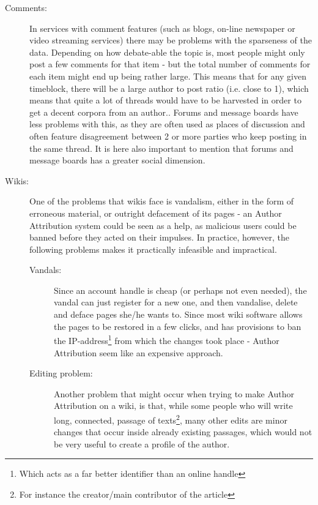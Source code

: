 \begin{description}
\item[Comments:] In services with comment features (such as blogs, on-line newspaper or video streaming services) there may be problems with the sparseness of the data. Depending on how debate-able the topic is, most people might only post a few comments for that item - but the total number of comments for each item might end up being rather large. This means that for any given timeblock, there will be a large author to post ratio (i.e. close to 1), which means that quite a lot of threads would have to be harvested in order to get a decent corpora from an author.. Forums and message boards have less problems with this, as they are often used as places of discussion and often feature disagreement between 2 or more parties who keep posting in the same thread. It is here also important to mention that forums and message boards has a greater social dimension.

\item[Wikis:] One of the problems that wikis face is vandalism, either in the form of erroneous material, or outright defacement of its pages - an Author Attribution system could be seen as a help, as malicious users could be banned before they acted on their impulses. In practice, however, the following problems makes it practically infeasible and impractical.
\begin{description}
\item[Vandals:] Since an account handle is cheap (or perhaps not even needed), the vandal can just register for a new one, and then vandalise, delete and deface pages she/he wants to. Since most wiki software allows the pages to be restored in a few clicks, and has provisions to ban the IP-address\footnote{Which acts as a far better identifier than an online handle} from which the changes took place - Author Attribution seem like an expensive approach.  

\item[Editing problem:] Another problem that might occur when trying to make Author Attribution on a wiki, is that, while some people who will write long, connected, passage of texts\footnote{For instance the creator/main contributor of the article}, many other edits are minor changes that occur inside already existing passages, which would not be very useful to create a profile of the author.   
\end{description} 
\end{description}

